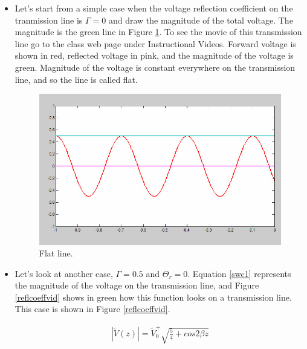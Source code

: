 \documentclass{ximera}
\begin{document}
\begin{itemize}
 \item Let's start 
from a simple case when the voltage reflection coefficient on the
tranmission line is $\Gamma=0$ and draw the magnitude of the total
voltage. The magnitude is the green line in Figure \ref{flatline}. To see the movie
of this transmission line go to the class web page under Instructional Videos. Forward voltage is shown in red, reflected voltage in pink,
and the magnitude of the voltage is  green. Magnitude of the voltage is constant everywhere on the transmission line, and so the line
is called flat.




\begin{figure}[htbp]
\begin{center}
\includegraphics[scale=0.3]{../jpg/flatline.jpg}
\end{center}
\caption{Flat line.}
\label{flatline}
\end{figure}



\item Let's look at another case,  $\Gamma=0.5$ and $\Theta_r=0$. Equation \ref{swc1}  represents the magnitude of the voltage on the transmission line, and Figure \ref{reflcoeffvid} shows in green how this function looks on a transmission line. This case is shown in Figure \ref{reflcoeffvid}. 

\begin{eqnarray}
|\tilde{V}(z)|=\tilde{V}_0^+ \sqrt{\frac{5}{4}+ cos{2 \beta z} }\label{swc1}
\end{eqnarray}


\end{itemize}
\end{document}
